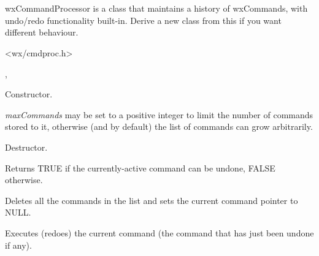 \section{}\label{wxcommandprocessor}

wxCommandProcessor is a class that maintains a history of wxCommands,
with undo/redo functionality built-in. Derive a new class from this
if you want different behaviour.




<wx/cmdproc.h>


, 




Constructor.

{\it maxCommands} may be set to a positive integer to limit the number of
commands stored to it, otherwise (and by default) the list of commands can grow
arbitrarily.



Destructor.



Returns TRUE if the currently-active command can be undone, FALSE otherwise.



Deletes all the commands in the list and sets the current command pointer to NULL.



Executes (redoes) the current command (the command that has just been undone if any).


